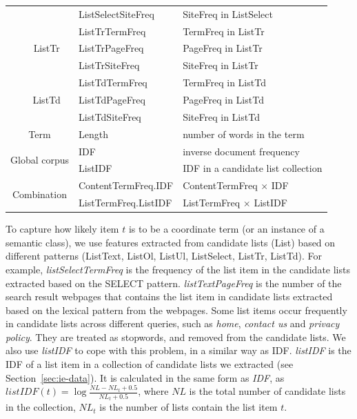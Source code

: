 \begin{table}[h!]
\begin{tabular}{|c|c|l|l|}
                  &                   &  ListSelectSiteFreq           & SiteFreq in ListSelect \\ \cline{2-4} 
                  & \multirow{3}{*}{ListTr} & ListTrTermFreq  & TermFreq in ListTr\\ 
                  &                   &  ListTrPageFreq       & PageFreq in ListTr \\ 
                  &                   &  ListTrSiteFreq       & SiteFreq in ListTr \\ \cline{2-4} 
                  & \multirow{3}{*}{ListTd} & ListTdTermFreq  & TermFreq in ListTd \\ 
                  &                   &  ListTdPageFreq       & PageFreq in ListTd \\ 
                  &                   &  ListTdSiteFreq       & SiteFreq in ListTd \\ \hline
\multicolumn{2}{|c|}{Term}                &  Length & number of words in the term \\ \hline
\multicolumn{2}{|c|}{\multirow{2}{*}{Global corpus}}   & IDF & inverse document frequency \\ 
\multicolumn{2}{|l|}{}                    &  ListIDF  & IDF in a candidate list collection \\  \hline
\multicolumn{2}{|c|}{\multirow{2}{*}{Combination}}   & ContentTermFreq.IDF &  ContentTermFreq $\times$ IDF \\ 
\multicolumn{2}{|l|}{}                    &  ListTermFreq.ListIDF & ListTermFreq $\times$ ListIDF \\  \hline
\end{tabular}
\end{table}


To capture how likely item $t$ is to be a coordinate term (or an instance of a semantic class), we use features extracted from candidate lists (List) based on different patterns (ListText, ListOl, ListUl, ListSelect, ListTr, ListTd). For example, \textit{listSelectTermFreq} is the frequency of the list item in the candidate lists extracted based on the SELECT pattern. \textit{listTextPageFreq} is the number of the search result webpages that contains the list item in candidate lists extracted based on the lexical pattern from the webpages. Some list items occur frequently in candidate lists across different queries, such as \textit{home}, \textit{contact us} and \textit{privacy policy}. They are treated as stopwords, and removed from the candidate lists. We also use \textit{listIDF} to cope with this problem, in a similar way as IDF.  \textit{listIDF} is the IDF of a list item in a collection of candidate lists we extracted (see Section~\ref{sec:ie-data}). It is calculated in the same form as \textit{IDF}, 
as $listIDF(t)=\log{\frac{NL-NL_{t}+0.5}{NL_t+0.5}}$, where $NL$ is the total number of candidate lists in the collection,  $NL_t$ is the number of lists contain the list item $t$.



